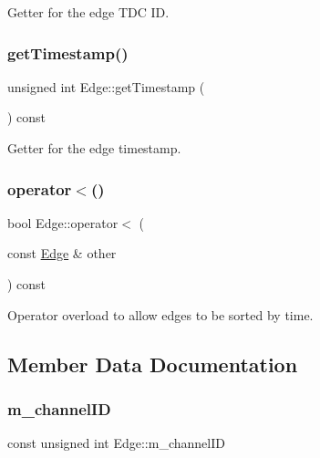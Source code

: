 Getter for the edge T\+DC ID. 

\mbox{\label{class_edge_a463ea176ce520b5a280a15b15b41dd1e}} 
\subsubsection{\texorpdfstring{get\+Timestamp()}{getTimestamp()}}
{\footnotesize\ttfamily unsigned int Edge\+::get\+Timestamp (\begin{DoxyParamCaption}{ }\end{DoxyParamCaption}) const\hspace{0.3cm}{\ttfamily [inline]}}



Getter for the edge timestamp. 

\mbox{\label{class_edge_ab6a06c5da57efed1991960f61e870c8b}} 
\subsubsection{\texorpdfstring{operator$<$()}{operator<()}}
{\footnotesize\ttfamily bool Edge\+::operator$<$ (\begin{DoxyParamCaption}\item[{const \hyperlink{class_edge}{Edge} \&}]{other }\end{DoxyParamCaption}) const}



Operator overload to allow edges to be sorted by time. 



\subsection{Member Data Documentation}
\mbox{\label{class_edge_af0ac0fc79aff55754ffbd152a2f71452}} 
\subsubsection{\texorpdfstring{m\+\_\+channel\+ID}{m\_channelID}}
{\footnotesize\ttfamily const unsigned int Edge\+::m\+\_\+channel\+ID\hspace{0.3cm}{\ttfamily [private]}}



